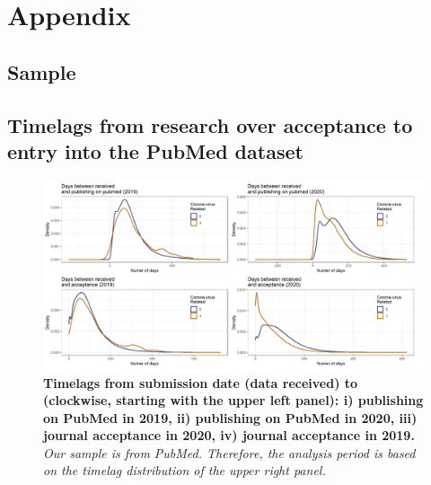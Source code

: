 

%
%





\clearpage
\newpage


\section{Appendix}

\subsection{Sample}
\label{sec:AppendixSample}

\subsection{Timelags from research over acceptance to entry into the PubMed dataset}
\label{subsec:Timelags}

\begin{figure}[!h]
\includegraphics[width=\textwidth]{1_chapter1/figures/Fig5.png} %
\caption{{\bf Timelags from submission date (data received) to (clockwise, starting with the upper left panel): i) publishing on PubMed in 2019, ii) publishing on PubMed in 2020, iii) journal acceptance in 2020, iv) journal acceptance in 2019.} \textit{Our sample is from PubMed. Therefore, the analysis period is based on the timelag distribution of the upper right panel.}}
\label{fig:Timelags} 
\end{figure}


